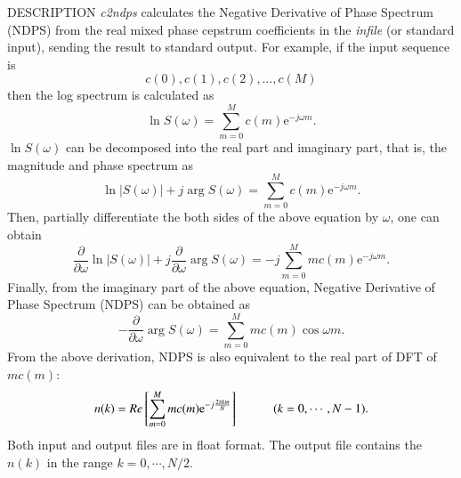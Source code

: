 \begin{synopsis}
 \item[c2ndps] [ --m $M$ ] [ --l $L$ ] [ --p ] [ --z ] [ {\em infile} ]
\end{synopsis}

\begin{qsection}{DESCRIPTION}
{\em c2ndps} calculates the Negative Derivative of Phase Spectrum (NDPS)
from the real mixed phase cepstrum coefficients in the {\em infile} (or standard input),
sending the result to standard output.
For example, if the input sequence is
\begin{displaymath}
   c(0),c(1),c(2),\dots,c(M)
\end{displaymath}
then the log spectrum is calculated as
\begin{displaymath}
\ln S(\omega) = \sum^{M}_{m=0}c(m)\mathrm{e}^{-j\omega m}.
\end{displaymath}
$\ln S(\omega)$ can be decomposed into the real part and imaginary part, that is, the magnitude and phase spectrum as
\begin{displaymath}
 \ln |S(\omega)| + j\arg S(\omega) = \sum^{M}_{m=0}c(m)\mathrm{e}^{-j\omega m}.
\end{displaymath}
 Then, partially differentiate the both sides of the above equation by $\omega$, one can obtain
\begin{displaymath}
 \frac{\partial}{\partial \omega}\ln |S(\omega)| + j\frac{\partial}{\partial \omega}\arg S(\omega) = -j \sum^{M}_{m=0}mc(m)\mathrm{e}^{-j\omega m}.
\end{displaymath}
 Finally, from the imaginary part of the above equation, Negative Derivative of Phase Spectrum (NDPS) can be obtained as
\begin{displaymath}
 -\frac{\partial}{\partial \omega}\arg S(\omega) = \sum^{M}_{m=0}mc(m)\cos \omega m.
\end{displaymath}
 From the above derivation, NDPS is also equivalent to the real part of DFT of $mc(m)$:
\begin{displaymath}
 n(k) = Re\left[ \sum^{M}_{m=0}mc(m)\mathrm{e}^{-j\frac{2\pi km}{N}} \right]\hspace{10mm} (k=0,\cdots,N-1).
\end{displaymath}
Both input and output files are in float format. The output file contains the $n(k)$ in the range $k=0,\cdots,N/2$.


\end{qsection}
